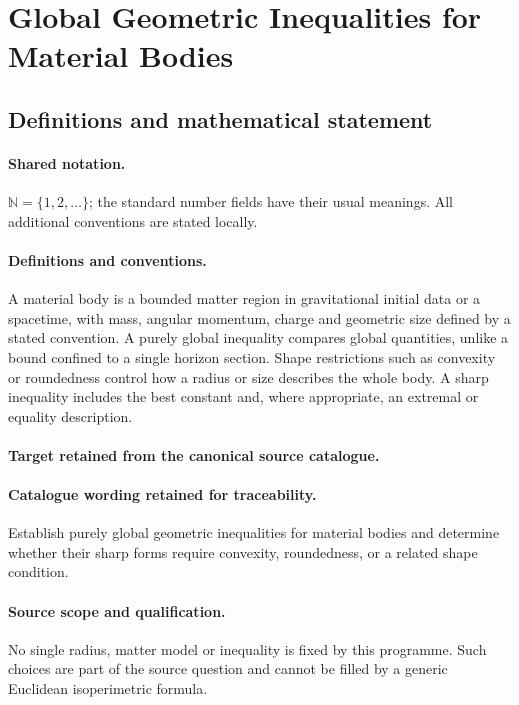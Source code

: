\documentclass[11pt]{article}
\begin{document}
\section{Global Geometric Inequalities for Material Bodies}\label{statement}

\subsection{Definitions and mathematical statement}

\paragraph{Shared notation.}$\mathbb N=\{1,2,\ldots\}$; the standard number fields have their usual meanings. All additional conventions are stated locally.


\paragraph{Definitions and conventions.}
A material body is a bounded matter region in gravitational initial data or a spacetime, with mass, angular momentum, charge and geometric size defined by a stated convention. A purely global inequality compares global quantities, unlike a bound confined to a single horizon section. Shape restrictions such as convexity or roundedness control how a radius or size describes the whole body. A sharp inequality includes the best constant and, where appropriate, an extremal or equality description.

\paragraph{Target retained from the canonical source catalogue.}
\paragraph{Catalogue wording retained for traceability.}
Establish purely global geometric inequalities for material bodies and determine whether their sharp forms require convexity, roundedness, or a related shape condition.

\paragraph{Source scope and qualification.}
No single radius, matter model or inequality is fixed by this programme. Such choices are part of the source question and cannot be filled by a generic Euclidean isoperimetric formula.
\end{document}

